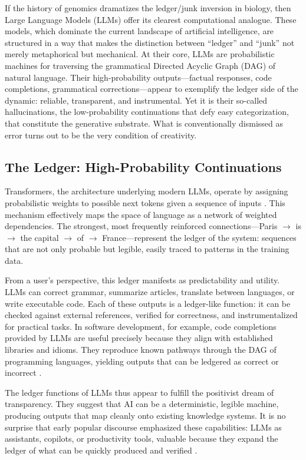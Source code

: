 \documentclass[11pt]{article}
\begin{document}
If the history of genomics dramatizes the ledger/junk inversion in biology, then Large Language Models (LLMs) offer its clearest computational analogue. These models, which dominate the current landscape of artificial intelligence, are structured in a way that makes the distinction between ``ledger'' and ``junk'' not merely metaphorical but mechanical. At their core, LLMs are probabilistic machines for traversing the grammatical Directed Acyclic Graph (DAG) of natural language. Their high-probability outputs---factual responses, code completions, grammatical corrections---appear to exemplify the ledger side of the dynamic: reliable, transparent, and instrumental. Yet it is their so-called hallucinations, the low-probability continuations that defy easy categorization, that constitute the generative substrate. What is conventionally dismissed as error turns out to be the very condition of creativity.

\subsection{The Ledger: High-Probability Continuations}
Transformers, the architecture underlying modern LLMs, operate by assigning probabilistic weights to possible next tokens given a sequence of inputs \citep{vaswani2017}. This mechanism effectively maps the space of language as a network of weighted dependencies. The strongest, most frequently reinforced connections---Paris $\to$ is $\to$ the capital $\to$ of $\to$ France---represent the ledger of the system: sequences that are not only probable but legible, easily traced to patterns in the training data.

From a user’s perspective, this ledger manifests as predictability and utility. LLMs can correct grammar, summarize articles, translate between languages, or write executable code. Each of these outputs is a ledger-like function: it can be checked against external references, verified for correctness, and instrumentalized for practical tasks. In software development, for example, code completions provided by LLMs are useful precisely because they align with established libraries and idioms. They reproduce known pathways through the DAG of programming languages, yielding outputs that can be ledgered as correct or incorrect \citep{chen2021}.

The ledger functions of LLMs thus appear to fulfill the positivist dream of transparency. They suggest that AI can be a deterministic, legible machine, producing outputs that map cleanly onto existing knowledge systems. It is no surprise that early popular discourse emphasized these capabilities: LLMs as assistants, copilots, or productivity tools, valuable because they expand the ledger of what can be quickly produced and verified \citep{bommasani2021}.
\end{document}
